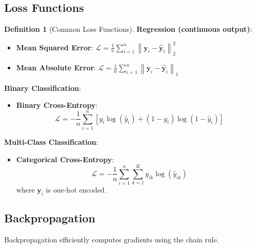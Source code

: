 \documentclass[11pt,twoside]{article}
\numberwithin{equation}{section}
\newcommand{\vect}[1]{\bm{#1}}
\newcommand{\norm}[1]{\left\lVert#1\right\rVert}
\newcommand{\Loss}{\mathcal{L}}
\theoremstyle{plain}
\theoremstyle{definition}
\newtheorem{definition}[theorem]{Definition}
\theoremstyle{remark}
\begin{document}
\subsection{Loss Functions}

\begin{definition}[Common Loss Functions]

\textbf{Regression (continuous output)}:
\begin{itemize}
\item \textbf{Mean Squared Error}: $\Loss = \frac{1}{n}\sum_{i=1}^n \norm{\vect{y}_i - \hat{\vect{y}}_i}_2^2$
\item \textbf{Mean Absolute Error}: $\Loss = \frac{1}{n}\sum_{i=1}^n \norm{\vect{y}_i - \hat{\vect{y}}_i}_1$
\end{itemize}

\textbf{Binary Classification}:
\begin{itemize}
\item \textbf{Binary Cross-Entropy}:
\[
\Loss = -\frac{1}{n}\sum_{i=1}^n [y_i\log(\hat{y}_i) + (1-y_i)\log(1-\hat{y}_i)]
\]
\end{itemize}

\textbf{Multi-Class Classification}:
\begin{itemize}
\item \textbf{Categorical Cross-Entropy}:
\[
\Loss = -\frac{1}{n}\sum_{i=1}^n \sum_{k=1}^K y_{ik}\log(\hat{y}_{ik})
\]
where $\vect{y}_i$ is one-hot encoded.
\end{itemize}
\end{definition}

\subsection{Backpropagation}

Backpropagation efficiently computes gradients using the chain rule.
\end{document}

